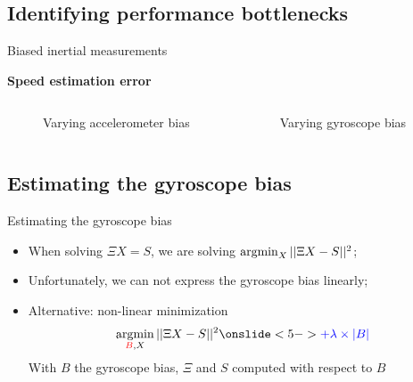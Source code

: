 \documentclass{beamer}
\newcommand{\argmin}{\operatornamewithlimits{argmin}}
\begin{document}
\subsection{Identifying performance bottlenecks}
\begin{frame}{Biased inertial measurements}

  \begin{center}
    \textbf{Speed estimation error}
  \end{center}

  \begin{columns}[T]
    \begin{figure}[h!]
      \centering
      \resizebox{0.85\textwidth}{!}{}
      \caption{Varying accelerometer bias}
    \end{figure}
    \begin{figure}[h!]
      \centering
      \resizebox{0.85\textwidth}{!}{}
      \caption{Varying gyroscope bias}
    \end{figure}

  \end{columns}
\end{frame}

\subsection{Estimating the gyroscope bias}
\begin{frame}{Estimating the gyroscope bias}

  \begin{itemize}[<+->]
  \item When solving  $\Xi X = S$, we are solving $\argmin_X ||\Xi X - S||^2$;
  \item Unfortunately, we can not express the gyroscope bias linearly;
  \item Alternative: non-linear minimization
  \[
  \argmin_{\textcolor{red}{B},X} ||\Xi X - S||^2 \onslide<5->{\textcolor{blue}{+ \lambda \times |B|}}
  \]
  {\tiny With $B$ the gyroscope bias, $\Xi$ and $S$ computed with respect to $B$}
  \end{itemize}

  \begin{figure}[h!]
    \centering
      \begin{subfigure}[b]{0.47\textwidth}
        \resizebox{\textwidth}{!}{}
      \end{subfigure}
  \end{figure}

\end{frame}
\end{document}
